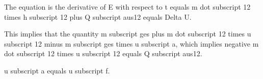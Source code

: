 The equation is the derivative of E with respect to t equals m dot subscript 12 times h subscript 12 plus Q subscript aus12 equals Delta U.

This implies that the quantity m subscript ges plus m dot subscript 12 times u subscript 12 minus m subscript ges times u subscript a, which implies negative m dot subscript 12 times u subscript 12 equals Q subscript aus12.

u subscript a equals u subscript f.